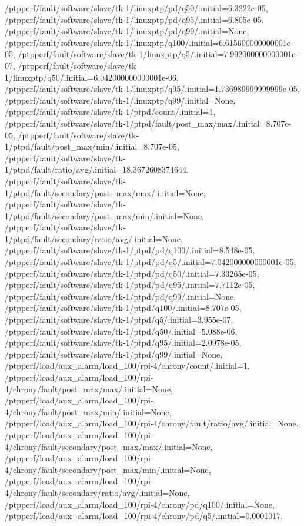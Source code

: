 {    /ptpperf/fault/software/slave/tk-1/linuxptp/pd/q50/.initial=6.3222e-05,
    /ptpperf/fault/software/slave/tk-1/linuxptp/pd/q95/.initial=6.805e-05,
    /ptpperf/fault/software/slave/tk-1/linuxptp/pd/q99/.initial=None,
    /ptpperf/fault/software/slave/tk-1/linuxptp/q100/.initial=6.615600000000001e-05,
    /ptpperf/fault/software/slave/tk-1/linuxptp/q5/.initial=7.992000000000001e-07,
    /ptpperf/fault/software/slave/tk-1/linuxptp/q50/.initial=6.042000000000001e-06,
    /ptpperf/fault/software/slave/tk-1/linuxptp/q95/.initial=1.736989999999999e-05,
    /ptpperf/fault/software/slave/tk-1/linuxptp/q99/.initial=None,
    /ptpperf/fault/software/slave/tk-1/ptpd/count/.initial=1,
    /ptpperf/fault/software/slave/tk-1/ptpd/fault/post_max/max/.initial=8.707e-05,
    /ptpperf/fault/software/slave/tk-1/ptpd/fault/post_max/min/.initial=8.707e-05,
    /ptpperf/fault/software/slave/tk-1/ptpd/fault/ratio/avg/.initial=18.3672608374644,
    /ptpperf/fault/software/slave/tk-1/ptpd/fault/secondary/post_max/max/.initial=None,
    /ptpperf/fault/software/slave/tk-1/ptpd/fault/secondary/post_max/min/.initial=None,
    /ptpperf/fault/software/slave/tk-1/ptpd/fault/secondary/ratio/avg/.initial=None,
    /ptpperf/fault/software/slave/tk-1/ptpd/pd/q100/.initial=8.548e-05,
    /ptpperf/fault/software/slave/tk-1/ptpd/pd/q5/.initial=7.042000000000001e-05,
    /ptpperf/fault/software/slave/tk-1/ptpd/pd/q50/.initial=7.33265e-05,
    /ptpperf/fault/software/slave/tk-1/ptpd/pd/q95/.initial=7.7112e-05,
    /ptpperf/fault/software/slave/tk-1/ptpd/pd/q99/.initial=None,
    /ptpperf/fault/software/slave/tk-1/ptpd/q100/.initial=8.707e-05,
    /ptpperf/fault/software/slave/tk-1/ptpd/q5/.initial=3.955e-07,
    /ptpperf/fault/software/slave/tk-1/ptpd/q50/.initial=5.088e-06,
    /ptpperf/fault/software/slave/tk-1/ptpd/q95/.initial=2.0978e-05,
    /ptpperf/fault/software/slave/tk-1/ptpd/q99/.initial=None,
    /ptpperf/load/aux_alarm/load_100/rpi-4/chrony/count/.initial=1,
    /ptpperf/load/aux_alarm/load_100/rpi-4/chrony/fault/post_max/max/.initial=None,
    /ptpperf/load/aux_alarm/load_100/rpi-4/chrony/fault/post_max/min/.initial=None,
    /ptpperf/load/aux_alarm/load_100/rpi-4/chrony/fault/ratio/avg/.initial=None,
    /ptpperf/load/aux_alarm/load_100/rpi-4/chrony/fault/secondary/post_max/max/.initial=None,
    /ptpperf/load/aux_alarm/load_100/rpi-4/chrony/fault/secondary/post_max/min/.initial=None,
    /ptpperf/load/aux_alarm/load_100/rpi-4/chrony/fault/secondary/ratio/avg/.initial=None,
    /ptpperf/load/aux_alarm/load_100/rpi-4/chrony/pd/q100/.initial=None,
    /ptpperf/load/aux_alarm/load_100/rpi-4/chrony/pd/q5/.initial=0.0001017,
}
